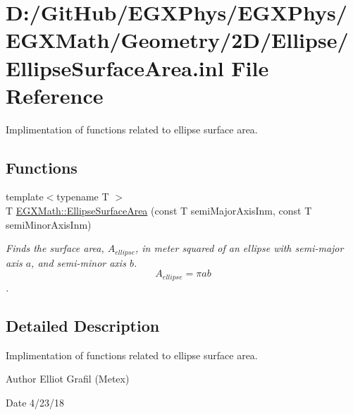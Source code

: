 \hypertarget{_ellipse_surface_area_8inl}{}\section{D\+:/\+Git\+Hub/\+E\+G\+X\+Phys/\+E\+G\+X\+Phys/\+E\+G\+X\+Math/\+Geometry/2\+D/\+Ellipse/\+Ellipse\+Surface\+Area.inl File Reference}
\label{_ellipse_surface_area_8inl}


Implimentation of functions related to ellipse surface area.  


\subsection*{Functions}
\begin{DoxyCompactItemize}
\item 
{\footnotesize template$<$typename T $>$ }\\T \mbox{\hyperlink{group___e_g_x_math-_geometry-2_d-_ellipse-_surface_area_ga4ce8c8323e9718ce5458f4ab7f6d823d}{E\+G\+X\+Math\+::\+Ellipse\+Surface\+Area}} (const T semi\+Major\+Axis\+Inm, const T semi\+Minor\+Axis\+Inm)
\begin{DoxyCompactList}\small\item\em Finds the surface area, $A_{ellipse}$, in meter squared of an ellipse with semi-\/major axis $a$, and semi-\/minor axis $b$. \[ A_{ellipse}=\pi a b \]. \end{DoxyCompactList}\end{DoxyCompactItemize}


\subsection{Detailed Description}
Implimentation of functions related to ellipse surface area. 

\begin{DoxyAuthor}{Author}
Elliot Grafil (Metex) 
\end{DoxyAuthor}
\begin{DoxyDate}{Date}
4/23/18 
\end{DoxyDate}
